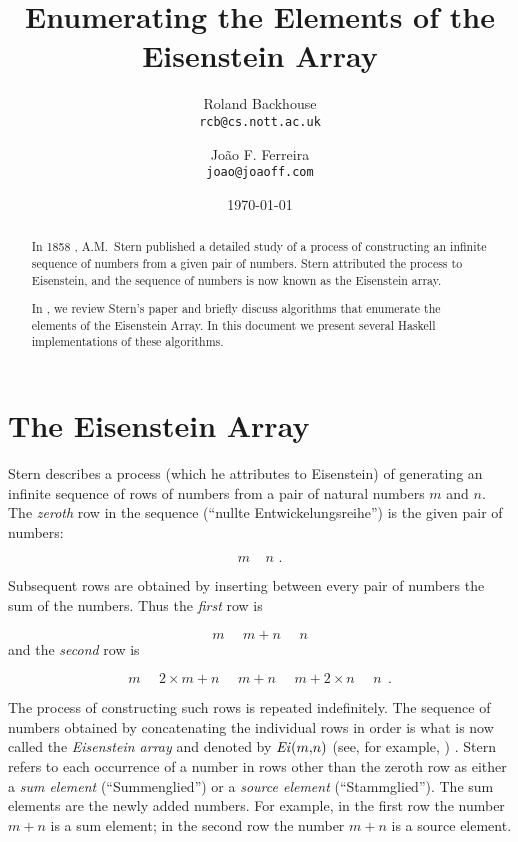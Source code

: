 \documentclass[leqno,fleqn,12pt]{article}
\title{Enumerating the Elements of the Eisenstein Array}
\author{
   Roland Backhouse \\{\tt\small rcb@cs.nott.ac.uk} 
   \and 
   Jo\~ao F. Ferreira \\{\tt\small joao@joaoff.com}
}
\date{\today}
\begin{document}
\maketitle

\begin{abstract} In 1858 \cite{stern1858:rationals}, A.M.\ Stern
published a detailed study of a process of constructing an infinite
sequence of numbers from a given pair of numbers.  Stern attributed
the process to Eisenstein, and the sequence of numbers is now known as
the Eisenstein array.

In \cite{jff*09:euclid-alg}, we review Stern's paper and briefly
discuss algorithms that enumerate the elements of the Eisenstein
Array. In this document we present  several Haskell
implementations of these algorithms.  \end{abstract}


\section{The Eisenstein Array} 
Stern \cite{stern1858:rationals} describes a process (which he
attributes to Eisenstein) of generating an infinite sequence of rows
of numbers from a pair of  natural numbers $m$ and $n$.  
The \emph{zeroth} row in the sequence (``nullte
Entwickelungsreihe'') is the given pair of numbers:

\begin{displaymath}
m\ \ \ \ \ n\mbox{\ \ \ .}
\end{displaymath}

Subsequent rows are obtained by inserting between every pair of numbers the sum of the numbers.  Thus
the \emph{first} row is

\begin{displaymath}
m\ \ \ \ \ \ m{+}n\ \ \ \ \ \ n 
\end{displaymath}
and the \emph{second} row is

\begin{displaymath}
m\ \ \ \ \ \ 2{\times}m + n\ \ \ \ \ \ m{+}n\ \ \ \ \ \ m + 2{\times}n\ \ \ \ \ \ n~~. 
\end{displaymath}

The process of constructing such rows is repeated indefinitely.  The
sequence of numbers obtained by concatenating the individual rows in
order is what is now called the \emph{Eisenstein array} and denoted by
 $\mathit{Ei\/}(m{,}n)$ (see, for example, \cite[sequence
A064881]{sloane-integers}) .  Stern refers to each occurrence of a
number in rows other than the zeroth row as either a \emph{sum
element} (``Summenglied'') or a \emph{source element}
(``Stammglied'').  The sum elements are the newly added numbers.  For
example, in the first row the number $m{+}n$ is a sum element; in the
second row the number $m{+}n$ is a source element.
\end{document}
